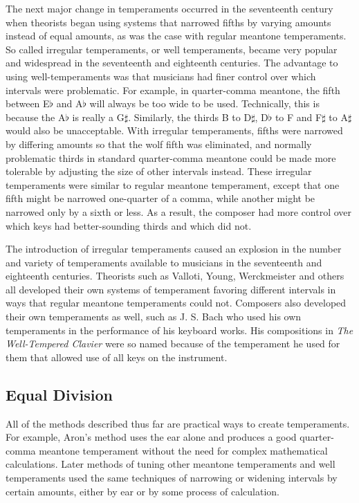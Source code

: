The next major change in temperaments occurred in the seventeenth century when theorists began using
systems that narrowed fifths by varying amounts instead of equal amounts, as was the case with
regular meantone temperaments.  So called irregular temperaments, or well temperaments, became very
popular and widespread in the seventeenth and eighteenth centuries.  The advantage to using well-temperaments 
was that musicians had finer control over which intervals were problematic.  For
example, in quarter-comma meantone, the fifth between E$\flat$ and A$\flat$ will always be too wide
to be used.  Technically, this is because the A$\flat$ is really a G$\sharp$. \autocite[35]{RD:1}
Similarly, the thirds B to D$\sharp$, D$\flat$ to F and F$\sharp$ to A$\sharp$ would also be
unacceptable.  With irregular temperaments, fifths were narrowed by differing amounts so that the
wolf fifth was eliminated, and normally problematic thirds in standard quarter-comma meantone could
be made more tolerable by adjusting the size of other intervals instead. These irregular
temperaments were similar to regular meantone temperament, except that one fifth might be narrowed
one-quarter of a comma, while another might be narrowed only by a sixth or less.  As a result, the
composer had more control over which keys had better-sounding thirds and which did not.

The introduction of irregular temperaments caused an explosion in the number and variety of
temperaments available to musicians in the seventeenth and eighteenth centuries. Theorists such as
Valloti, Young, Werckmeister and others all developed their own systems of temperament favoring
different intervals in ways that regular meantone temperaments could not.  Composers also developed
their own temperaments as well, such as J. S. Bach who used his own temperaments in the performance
of his keyboard works.  His compositions in \textit{The Well-Tempered Clavier} were so named because
of the temperament he used for them that allowed use of all keys on the instrument.

\subsection{Equal Division}

All of the methods described thus far are practical ways to create temperaments.
For example, Aron's method uses the ear alone and produces a good quarter-comma 
meantone temperament without the need for complex mathematical calculations. Later methods
of tuning other meantone temperaments and well temperaments used the same techniques of
narrowing or widening intervals by certain amounts, either by ear or by some process of
calculation.

